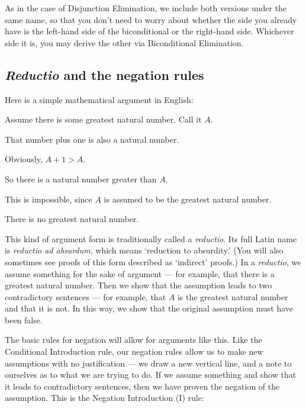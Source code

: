 \begin{multicols}{2}
\begin{ndproof}
	\metaA{}
	\metaB{} 
\end{ndproof}
\begin{ndproof}
	\metaB{}
	\metaA{} 
\end{ndproof}
\end{multicols}

As in the case of Disjunction Elimination, we include both versions under the same name, so that you don't need to worry about whether the side you already have is the left-hand side of the biconditional or the right-hand side. Whichever side it is, you may derive the other via Biconditional Elimination.


\subsection{\emph{Reductio} and the negation rules}
Here is a simple mathematical argument in English:
\begin{earg}
\item[] Assume there is some greatest natural number. Call it $A$.
\item[] That number plus one is also a natural number.
\item[] Obviously, $A+1 > A$.
\item[] So there is a natural number greater than $A$.
\item[] This is impossible, since $A$ is assumed to be the greatest natural number.
\item[\therefore] There is no greatest natural number.
\end{earg}

This kind of argument form is traditionally called a \emph{reductio}. Its full Latin name is \emph{reductio ad absurdum}, which means `reduction to absurdity.' (You will also sometimes see proofs of this form described as `indirect' proofs.) In a \emph{reductio}, we assume something for the sake of argument --- for example, that there is a greatest natural number. Then we show that the assumption leads to two contradictory sentences --- for example, that $A$ is the greatest natural number and that it is not. In this way, we show that the original assumption must have been false.

The basic rules for negation will allow for arguments like this. Like the Conditional Introduction rule, our negation rules allow us to make new assumptions with no justification --- we draw a new vertical line, and a note to ourselves as to what we are trying to do. If we assume something and show that it leads to contradictory sentences, then we have proven the negation of the assumption. This is the Negation Introduction ({\enot}I) rule:

